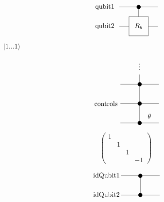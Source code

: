 \documentclass{article}
\begin{document}
\[
             \begin{tikzpicture}[scale=.5]
             \node[draw=none] at (-3.5, 2) {qubit1};
             \node[draw=none] at (-3.5, 0) {qubit2};

             \draw (-2, 2) -- (2, 2);
             \draw[fill=black] (0, 2) circle (.2);
             \draw (0, 2) -- (0, 1);
             
             \draw (-2,0) -- (-1, 0);
             \draw (1, 0) -- (2, 0);
             \draw (-1,-1)--(-1,1)--(1,1)--(1,-1)--cycle;
             \node[draw=none] at (0, 0) {$R_\theta$};
             \end{tikzpicture}
 \]
\pagebreak

$ |1 \dots 1 \rangle $
\pagebreak

\[
             \begin{tikzpicture}[scale=.5]
             \node[draw=none] at (-3.5, 2) {controls};
             \node[draw=none] at (1, .7) {$\theta$};
             
             \node[draw=none] at (0, 6) {$\vdots$};
             \draw (0, 5) -- (0, 4);
             
             \draw (-2, 4) -- (2, 4);
             \draw[fill=black] (0, 4) circle (.2);
             \draw (0, 4) -- (0, 2); 
             
             \draw (-2, 2) -- (2, 2);
             \draw[fill=black] (0, 2) circle (.2);
             \draw (0, 2) -- (0, 0);
             
             \draw (-2,0) -- (2, 0);
             \draw[fill=black] (0, 0) circle (.2);
             \end{tikzpicture}
\]
\pagebreak

\[
\begin{pmatrix}
1 \\
& 1 \\\
& & 1 \\
& & & -1 
\end{pmatrix}
\]
\pagebreak

\[
             \begin{tikzpicture}[scale=.5]
             \node[draw=none] at (-3.5, 2) {idQubit1};
             \node[draw=none] at (-3.5, 0) {idQubit2};

             \draw (-2, 2) -- (2, 2);
             \draw[fill=black] (0, 2) circle (.2);
             \draw (0, 2) -- (0, 0);
             
             \draw (-2,0) -- (2, 0);
             \draw[fill=black] (0, 0) circle (.2);
             \end{tikzpicture}
 \]
\pagebreak
\end{document}
